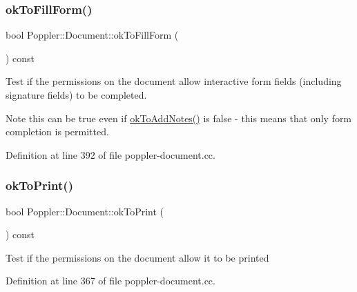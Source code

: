 \mbox{\label{class_poppler_1_1_document_afff0dbfbc5bc11c18784d814db1c4178}} 
\subsubsection{\texorpdfstring{ok\+To\+Fill\+Form()}{okToFillForm()}}
{\footnotesize\ttfamily bool Poppler\+::\+Document\+::ok\+To\+Fill\+Form (\begin{DoxyParamCaption}{ }\end{DoxyParamCaption}) const}

Test if the permissions on the document allow interactive form fields (including signature fields) to be completed.

\begin{DoxyNote}{Note}
this can be true even if \hyperlink{class_poppler_1_1_document_a33fa45a3666edcdc9b5deb34861a6670}{ok\+To\+Add\+Notes()} is false -\/ this means that only form completion is permitted. 
\end{DoxyNote}


Definition at line 392 of file poppler-\/document.\+cc.

\mbox{\label{class_poppler_1_1_document_adf941fadec1ccca91f2e209f935c497d}} 
\subsubsection{\texorpdfstring{ok\+To\+Print()}{okToPrint()}}
{\footnotesize\ttfamily bool Poppler\+::\+Document\+::ok\+To\+Print (\begin{DoxyParamCaption}{ }\end{DoxyParamCaption}) const}

Test if the permissions on the document allow it to be printed 

Definition at line 367 of file poppler-\/document.\+cc.

\mbox{\label{class_poppler_1_1_document_a8fcbb451e7fcd2a72d0dce90a7815de4}} 
